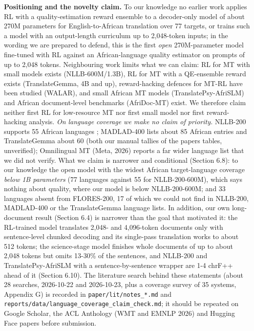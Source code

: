 \textbf{Positioning and the novelty claim.} To our knowledge no earlier work applies RL with a quality-estimation reward ensemble to a decoder-only model of about 270M parameters for English-to-African translation over 77 targets, or trains such a model with an output-length curriculum up to 2,048-token inputs; in the wording we are prepared to defend, this is the first \emph{open} 270M-parameter model fine-tuned with RL against an African-language quality estimator on prompts of up to 2,048 tokens. Neighbouring work limits what we can claim: RL for MT with small models exists (NLLB-600M/1.3B), RL for MT with a QE-ensemble reward exists (TranslateGemma, 4B and up), reward-hacking defences for MT-RL have been studied (WALAR), and small African MT models (TranslatePsy-AfriSLM) and African document-level benchmarks (AfriDoc-MT) exist. We therefore claim neither first RL for low-resource MT nor first small model nor first reward-hacking analysis. \emph{On language coverage we make no claim of priority.} NLLB-200 supports 55 African languages \citep{nllb2022nllb}; MADLAD-400 lists about 85 African entries \citep{kudugunta2023madlad} and TranslateGemma about 60 \citep{finkelstein2026translategemma} (both our manual tallies of the papers\textquotesingle{} tables, unverified); Omnilingual MT (Meta, 2026) reports a far wider language list that we did not verify. What we claim is narrower and conditional (Section 6.8): to our knowledge the open model with the widest African target-language coverage \emph{below 1B parameters} (77 languages against 55 for NLLB-200-600M), which says nothing about quality, where our model is below NLLB-200-600M; and 33 languages absent from FLORES-200, 17 of which we could not find in NLLB-200, MADLAD-400 or the TranslateGemma language lists. In addition, our own long-document result (Section 6.4) is narrower than the goal that motivated it: the RL-trained model translates 2,048- and 4,096-token documents only with sentence-level chunked decoding and its single-pass translation works to about 512 tokens; the science-stage model finishes whole documents of up to about 2,048 tokens but omits 13-30\% of the sentences, and NLLB-200 and TranslatePsy-AfriSLM with a sentence-by-sentence wrapper are 1-4 chrF++ ahead of it (Section 6.10). The literature search behind these statements (about 28 searches, 2026-10-22 and 2026-10-23, plus a coverage survey of 35 systems, Appendix G) is recorded in \texttt{paper/lit/notes\_*.md} and \texttt{reports/data/language\_coverage\_claim\_check.md}; it should be repeated on Google Scholar, the ACL Anthology (WMT and EMNLP 2026) and Hugging Face papers before submission.

